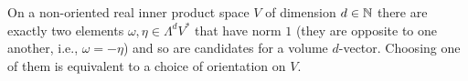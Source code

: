 \begin{remark}
  On a non-oriented real inner product space $V$ of dimension $d \in \mathbb{N}$
  there are exactly two elements $\omega, \eta \in\Lambda^d V^*$ that have norm
  $1$ (they are opposite to one another, i.e., $\omega = -\eta$) and so are
  candidates for a volume $d$-vector.
  Choosing one of them is equivalent to a choice of orientation on $V$.
\end{remark}
